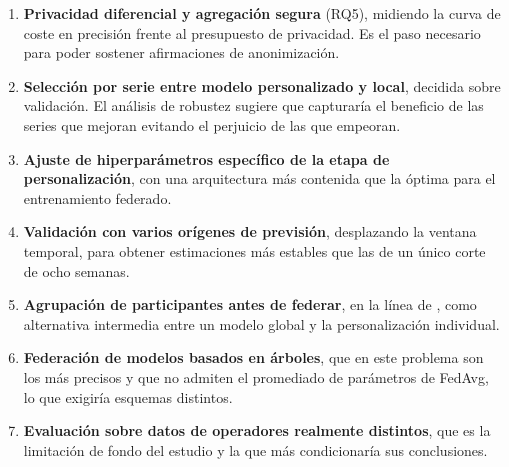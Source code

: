 \begin{enumerate}
  \item \textbf{Privacidad diferencial y agregación segura} (RQ5), midiendo la curva de coste en
    precisión frente al presupuesto de privacidad. Es el paso necesario para poder sostener
    afirmaciones de anonimización.

  \item \textbf{Selección por serie entre modelo personalizado y local}, decidida sobre validación.
    El análisis de robustez sugiere que capturaría el beneficio de las series que mejoran evitando
    el perjuicio de las que empeoran.

  \item \textbf{Ajuste de hiperparámetros específico de la etapa de personalización}, con una
    arquitectura más contenida que la óptima para el entrenamiento federado.

  \item \textbf{Validación con varios orígenes de previsión}, desplazando la ventana temporal, para
    obtener estimaciones más estables que las de un único corte de ocho semanas.

  \item \textbf{Agrupación de participantes antes de federar}, en la línea de
    \textcite{long2025pacfl}, como alternativa intermedia entre un modelo global y la
    personalización individual.

  \item \textbf{Federación de modelos basados en árboles}, que en este problema son los más
    precisos y que no admiten el promediado de parámetros de FedAvg, lo que exigiría esquemas
    distintos.

  \item \textbf{Evaluación sobre datos de operadores realmente distintos}, que es la limitación de
    fondo del estudio y la que más condicionaría sus conclusiones.
\end{enumerate}
